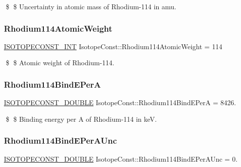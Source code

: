 \$ \$ Uncertainty in atomic mass of Rhodium-\/114 in amu. \mbox{\label{group___isotope_const-_rhodium-_rh114_ga963dad933747143541ce18593ac76c91}} 
\subsubsection{\texorpdfstring{Rhodium114\+Atomic\+Weight}{Rhodium114AtomicWeight}}
{\footnotesize\ttfamily \mbox{\hyperlink{group___isotope_const-_macros_ga5f18360b3e99483a35c32d789e62621c}{I\+S\+O\+T\+O\+P\+E\+C\+O\+N\+S\+T\+\_\+\+I\+NT}} Isotope\+Const\+::\+Rhodium114\+Atomic\+Weight = 114}

\$ \$ Atomic weight of Rhodium-\/114. \mbox{\label{group___isotope_const-_rhodium-_rh114_ga4e3c7b99b3bfe33bcf15b96b6625226f}} 
\subsubsection{\texorpdfstring{Rhodium114\+Bind\+E\+PerA}{Rhodium114BindEPerA}}
{\footnotesize\ttfamily \mbox{\hyperlink{group___isotope_const-_macros_ga8f45a7272ce02c0b4c65c44636ed719a}{I\+S\+O\+T\+O\+P\+E\+C\+O\+N\+S\+T\+\_\+\+D\+O\+U\+B\+LE}} Isotope\+Const\+::\+Rhodium114\+Bind\+E\+PerA = 8426.}

\$ \$ Binding energy per A of Rhodium-\/114 in keV. \mbox{\label{group___isotope_const-_rhodium-_rh114_gac2898e0e74257c1794df614acca9c4e1}} 
\subsubsection{\texorpdfstring{Rhodium114\+Bind\+E\+Per\+A\+Unc}{Rhodium114BindEPerAUnc}}
{\footnotesize\ttfamily \mbox{\hyperlink{group___isotope_const-_macros_ga8f45a7272ce02c0b4c65c44636ed719a}{I\+S\+O\+T\+O\+P\+E\+C\+O\+N\+S\+T\+\_\+\+D\+O\+U\+B\+LE}} Isotope\+Const\+::\+Rhodium114\+Bind\+E\+Per\+A\+Unc = 0.}

